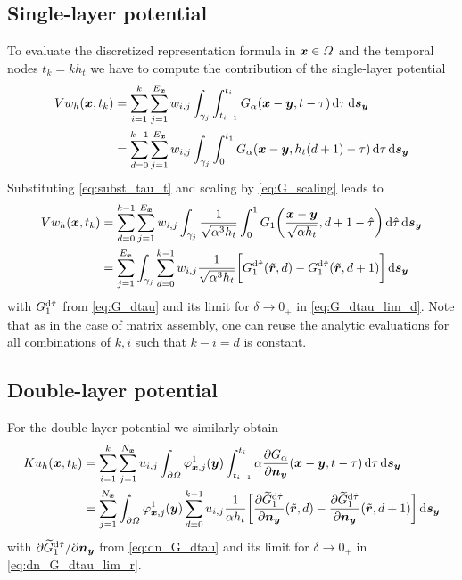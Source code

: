 \documentclass[a4paper,11pt]{article}
\begin{document}
\subsection{Single-layer potential}

To evaluate the discretized representation formula in ${{\bm{x}}}\in\Omega$ and the temporal nodes $t_k = k h_t$ we have to compute the contribution of the single-layer potential
\begin{align*}
 Vw_h({{\bm{x}}}, t_k) &= \sum_{i=1}^{k} \sum_{j=1}^{E_{{\bm{x}}}} w_{i,j} \int_{\gamma_j} \int_{t_{i-1}}^{t_i} G_\alpha({{\bm{x}}}-{{\bm{y}}},t-\tau) \,{\mathrm{d}}\tau \,{\mathrm{d}}{{\bm{s}}}_{{\bm{y}}} \\
 &= \sum_{d=0}^{k-1} \sum_{j=1}^{E_{{\bm{x}}}} w_{i,j} \int_{\gamma_j} \int_{0}^{t_1} G_\alpha({{\bm{x}}}-{{\bm{y}}},h_t(d+1)-\tau) \,{\mathrm{d}}\tau \,{\mathrm{d}}{{\bm{s}}}_{{\bm{y}}}
\end{align*}
Substituting \eqref{eq:subst_tau_t} and scaling by \eqref{eq:G_scaling} leads to
\begin{align*}
  Vw_h({{\bm{x}}}, t_k) &= \sum_{d=0}^{k-1} \sum_{j=1}^{E_{{\bm{x}}}} w_{i,j} \int_{\gamma_j} \frac{1}{\sqrt{\alpha^3 h_t}}\int_0^1 G_1\bigg(\frac{{{\bm{x}}}-{{\bm{y}}}}{\sqrt{\alpha h_t}},d+1-\hat\tau\bigg) \,{\mathrm{d}}\hat\tau \,{\mathrm{d}}{{\bm{s}}}_{{\bm{y}}} \\
  &= \sum_{j=1}^{E_{{\bm{x}}}} \int_{\gamma_j} \sum_{d=0}^{k-1} w_{i,j} \frac{1}{\sqrt{\alpha^3 h_t}} \bigg[ G_1^{{\mathrm{d}}\hat\tau}(\tilde {{{\bm{r}}}}, d) - G_1^{{\mathrm{d}}\hat\tau}(\tilde {{{\bm{r}}}}, d+1) \bigg] \,{\mathrm{d}}{{\bm{s}}}_{{\bm{y}}}
\end{align*}
with $G_1^{{\mathrm{d}}\hat\tau}$ from \eqref{eq:G_dtau} and its limit for $\delta \to 0_+$ in \eqref{eq:G_dtau_lim_d}. Note that as in the case of matrix assembly, one can reuse the analytic evaluations for all combinations of $k,i$ such that $k-i=d$ is constant.

\subsection{Double-layer potential}

For the double-layer potential we similarly obtain
\begin{align*}
  Ku_h({{\bm{x}}}, t_k) &= \sum_{i=1}^{k} \sum_{j=1}^{N_{{\bm{x}}}} u_{i,j} \int_{\partial\Omega} \varphi^1_{{{\bm{x}}},j}({{\bm{y}}}) \int_{t_{i-1}}^{t_i} \alpha \frac{\partial G_\alpha}{\partial {\ensuremath{{\bm{n}}}}_{{\bm{y}}}}({{\bm{x}}}-{{\bm{y}}},t-\tau) \,{\mathrm{d}}\tau \,{\mathrm{d}}{{\bm{s}}}_{{\bm{y}}} \\
  &= \sum_{j=1}^{N_{{\bm{x}}}} \int_{\partial\Omega} \varphi^1_{{{\bm{x}}},j}({{\bm{y}}}) \sum_{d=0}^{k-1} u_{i,j} \frac{1}{\alpha h_t} \bigg[ \frac{\partial \widetilde G_1^{{\mathrm{d}}\hat\tau}}{\partial {\ensuremath{{\bm{n}}}}_{{\bm{y}}}}(\tilde {{{\bm{r}}}}, d) - \frac{\partial \widetilde G_1^{{\mathrm{d}}\hat\tau}}{\partial {\ensuremath{{\bm{n}}}}_{{\bm{y}}}}(\tilde {{{\bm{r}}}}, d+1) \bigg] \,{\mathrm{d}}{{\bm{s}}}_{{\bm{y}}}
\end{align*}
with $\partial \widetilde G_1^{{\mathrm{d}}\hat\tau} / \partial {\ensuremath{{\bm{n}}}}_{{\bm{y}}}$ from \eqref{eq:dn_G_dtau} and its limit for $\delta \to 0_+$ in \eqref{eq:dn_G_dtau_lim_r}.

\newpage


\end{document}
